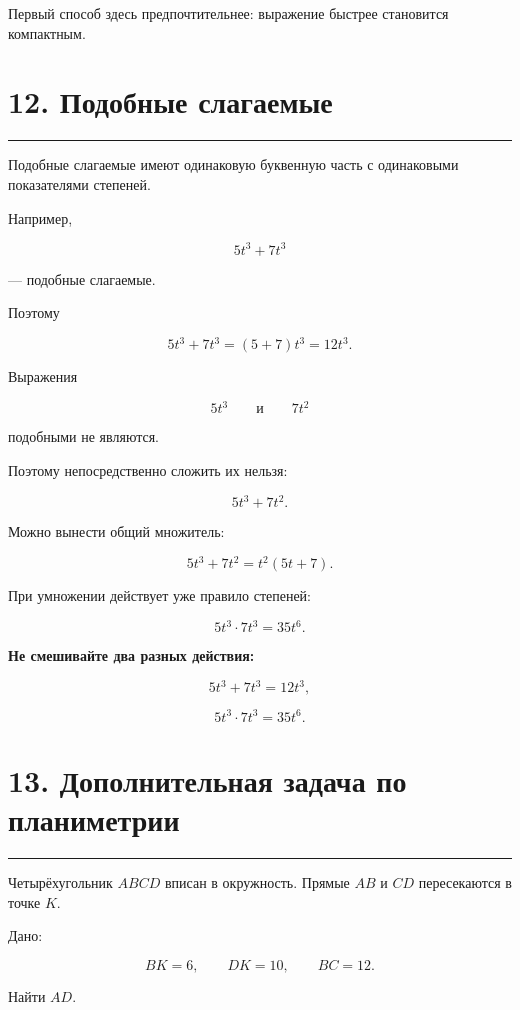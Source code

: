 \documentclass[a4paper,12pt]{article}
\newcommand{\sectionline}{\par\vspace{0.15em}\noindent\textcolor{accent}{\rule{\linewidth}{0.7pt}}\par\vspace{0.2em}}
\newcommand{\key}[1]{\textcolor{darkaccent}{\textbf{#1}}}
\begin{document}
Первый способ здесь предпочтительнее: выражение быстрее становится компактным.


\section*{12. Подобные слагаемые}
\sectionline

Подобные слагаемые имеют одинаковую буквенную часть с одинаковыми показателями степеней.

Например,

\[
5t^3+7t^3
\]

--- подобные слагаемые.

Поэтому

\[
5t^3+7t^3
=
(5+7)t^3
=
12t^3.
\]

Выражения

\[
5t^3
\qquad\text{и}\qquad
7t^2
\]

подобными не являются.

Поэтому непосредственно сложить их нельзя:

\[
5t^3+7t^2.
\]

Можно вынести общий множитель:

\[
5t^3+7t^2
=
t^2(5t+7).
\]

При умножении действует уже правило степеней:

\[
5t^3\cdot7t^3
=
35t^6.
\]

\key{Не смешивайте два разных действия:}

\[
5t^3+7t^3=12t^3,
\]

\[
5t^3\cdot7t^3=35t^6.
\]


\section*{13. Дополнительная задача по планиметрии}
\sectionline

Четырёхугольник \(ABCD\) вписан в окружность. Прямые \(AB\) и \(CD\) пересекаются в точке \(K\).

Дано:

\[
BK=6,
\qquad
DK=10,
\qquad
BC=12.
\]

Найти \(AD\).
\end{document}
